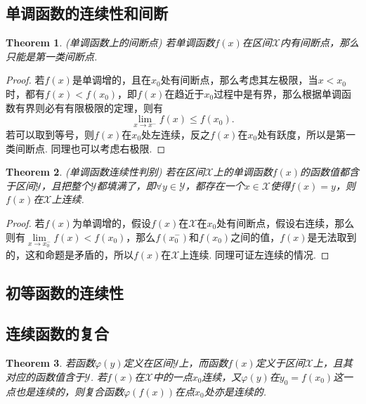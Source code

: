 \documentclass{article}
\newtheorem{theorem}{Theorem}[section]
\begin{document}
\subsection{单调函数的连续性和间断}

\begin{theorem}
\rm {\color{red} (单调函数上的间断点)} 若单调函数$f(x)$在区间$\mathcal{X}$内有间断点，那么只能是第一类间断点.
\end{theorem}

\begin{proof}
若$f(x)$是单调增的，且在$x_0$处有间断点，那么考虑其左极限，当$x < x_0$时，都有$f(x) < f(x_0)$，即$f(x)$在趋近于$x_0$过程中是有界，那么根据单调函数有界则必有有限极限的定理，则有
$$
\lim\limits_{x \rightarrow x^-} f(x) \leq f(x_0).
$$
若可以取到等号，则$f(x)$在$x_0$处左连续，反之$f(x)$在$x_0$处有跃度，所以是第一类间断点. 同理也可以考虑右极限.
\end{proof}

\begin{theorem}
\rm {\color{red} (单调函数连续性判别)} 若在区间$\mathcal{X}$上的单调函数$f(x)$的函数值都含于区间$\mathcal{Y}$，且把整个$\mathcal{Y}$都填满了，即$\forall y \in \mathcal{Y}$，都存在一个$x \in \mathcal{X}$使得$f(x) = y$，则$f(x)$在$\mathcal{X}$上连续.
\end{theorem}

\begin{proof}
若$f(x)$为单调增的，假设$f(x)$在$\mathcal{X}$在$x_0$处有间断点，假设右连续，那么则有$\lim\limits_{x \rightarrow x_0 ^-} f(x) < f(x_0)$，那么$f(x_0^-)$和$f(x_0)$之间的值，$f(x)$是无法取到的，这和命题是矛盾的，所以$f(x)$在$\mathcal{X}$上连续. 同理可证左连续的情况. 
\end{proof}

\subsection{初等函数的连续性}

\subsection{连续函数的复合}

\begin{theorem}
\rm 若函数$\varphi(y)$定义在区间$\mathcal{Y}$上，而函数$f(x)$定义于区间$\mathcal{X}$上，且其对应的函数值含于$\mathcal{Y}$. 若$f(x)$在$\mathcal{X}$中的一点$x_0$连续，又$\varphi(y)$在$y_0 = f(x_0)$这一点也是连续的，则复合函数$\varphi(f(x))$在点$x_0$处亦是连续的.
\end{theorem}
\end{document}
